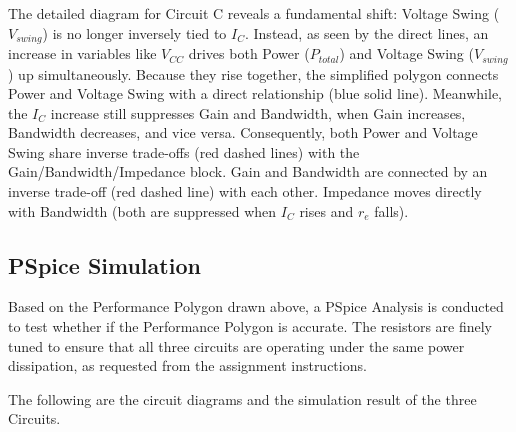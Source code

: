 \documentclass[11pt, a4paper]{article}
\begin{document}

The detailed diagram for Circuit C reveals a fundamental shift: Voltage Swing ($V_{swing}$) is no longer inversely tied to $I_C$. Instead, as seen by the direct lines, an increase in variables like $V_{CC}$ drives both Power ($P_{total}$) and Voltage Swing ($V_{swing}$) up simultaneously. Because they rise together, the simplified polygon connects Power and Voltage Swing with a direct relationship (blue solid line). Meanwhile, the $I_C$ increase still suppresses Gain and Bandwidth, when Gain increases, Bandwidth decreases, and vice versa. Consequently, both Power and Voltage Swing share inverse trade-offs (red dashed lines) with the Gain/Bandwidth/Impedance block. Gain and Bandwidth are connected by an inverse trade-off (red dashed line) with each other. Impedance moves directly with Bandwidth (both are suppressed when $I_C$ rises and $r_e$ falls).

\subsection*{PSpice Simulation}
Based on the Performance Polygon drawn above, a PSpice Analysis is conducted to test whether if the Performance Polygon is accurate.
The resistors are finely tuned to ensure that all three circuits are operating under the same power dissipation, as requested from the assignment instructions.

The following are the circuit diagrams and the simulation result of the three Circuits.
\end{document}
